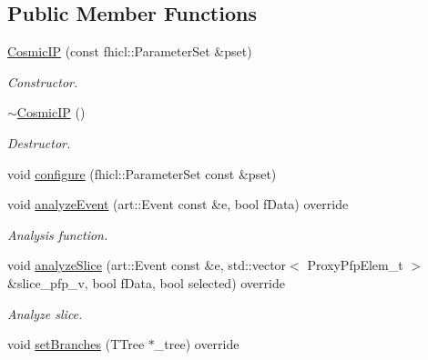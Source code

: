 \subsection*{Public Member Functions}
\begin{DoxyCompactItemize}
\item 
\hyperlink{classanalysis_1_1CosmicIP_aa34450dae6a5ea2d51520aefcc9c0e6f}{Cosmic\-I\-P} (const fhicl\-::\-Parameter\-Set \&pset)
\begin{DoxyCompactList}\small\item\em Constructor. \end{DoxyCompactList}\item 
\hypertarget{classanalysis_1_1CosmicIP_a7edbd55f2290fab4c766f9a749731626}{\hyperlink{classanalysis_1_1CosmicIP_a7edbd55f2290fab4c766f9a749731626}{$\sim$\-Cosmic\-I\-P} ()}\label{classanalysis_1_1CosmicIP_a7edbd55f2290fab4c766f9a749731626}

\begin{DoxyCompactList}\small\item\em Destructor. \end{DoxyCompactList}\item 
void \hyperlink{classanalysis_1_1CosmicIP_af2564ec208979037940ff500dea10246}{configure} (fhicl\-::\-Parameter\-Set const \&pset)
\item 
\hypertarget{classanalysis_1_1CosmicIP_aece9b4c45c6e1771df582b2c5e40c5d5}{void \hyperlink{classanalysis_1_1CosmicIP_aece9b4c45c6e1771df582b2c5e40c5d5}{analyze\-Event} (art\-::\-Event const \&e, bool f\-Data) override}\label{classanalysis_1_1CosmicIP_aece9b4c45c6e1771df582b2c5e40c5d5}

\begin{DoxyCompactList}\small\item\em Analysis function. \end{DoxyCompactList}\item 
void \hyperlink{classanalysis_1_1CosmicIP_a86c9683c997d233949d8116940918e32}{analyze\-Slice} (art\-::\-Event const \&e, std\-::vector$<$ Proxy\-Pfp\-Elem\-\_\-t $>$ \&slice\-\_\-pfp\-\_\-v, bool f\-Data, bool selected) override
\begin{DoxyCompactList}\small\item\em Analyze slice. \end{DoxyCompactList}\item 
\hypertarget{classanalysis_1_1CosmicIP_aa676a555c1fed07fac6af653db6610ce}{void \hyperlink{classanalysis_1_1CosmicIP_aa676a555c1fed07fac6af653db6610ce}{set\-Branches} (T\-Tree $\ast$\-\_\-tree) override}\label{classanalysis_1_1CosmicIP_aa676a555c1fed07fac6af653db6610ce}


\end{DoxyCompactItemize}
